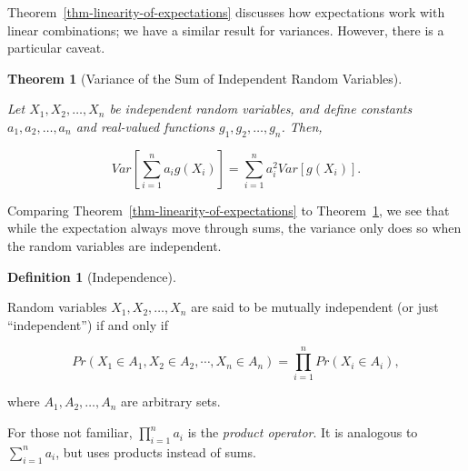 \documentclass[
  letterpaper,
  DIV=11,
  numbers=noendperiod]{scrreprt}
\theoremstyle{definition}
\newtheorem{definition}{Definition}[chapter]
\theoremstyle{plain}
\newtheorem{theorem}{Theorem}[chapter]
\theoremstyle{definition}
\theoremstyle{remark}
\begin{document}
Theorem~\ref{thm-linearity-of-expectations} discusses how expectations
work with linear combinations; we have a similar result for variances.
However, there is a particular caveat.

\begin{theorem}[Variance of the Sum of Independent Random
Variables]\protect\hypertarget{thm-variance-independent-sum}{}\label{thm-variance-independent-sum}

Let \(X_1, X_2, \dotsc, X_n\) be independent random variables, and
define constants \(a_1, a_2, \dotsc, a_n\) and real-valued functions
\(g_1, g_2, \dotsc, g_n\). Then,

\[Var\left[\sum_{i=1}^{n} a_i g\left(X_i\right)\right] = \sum_{i=1}^{n} a^2_i Var\left[g\left(X_i\right)\right].\]

\end{theorem}

Comparing Theorem~\ref{thm-linearity-of-expectations} to
Theorem~\ref{thm-variance-independent-sum}, we see that while the
expectation always move through sums, the variance only does so when the
random variables are independent.

\begin{definition}[Independence]\protect\hypertarget{def-independence}{}\label{def-independence}

Random variables \(X_1, X_2, \dotsc, X_n\) are said to be mutually
independent (or just ``independent'') if and only if

\[Pr\left(X_1 \in A_1, X_2 \in A_2, \dotsb, X_n \in A_n\right) = \prod_{i=1}^{n} Pr\left(X_i \in A_i\right),\]

where \(A_1, A_2, \dotsc, A_n\) are arbitrary sets.

\end{definition}

\begin{tcolorbox}[enhanced jigsaw, breakable, colframe=quarto-callout-note-color-frame, titlerule=0mm, arc=.35mm, coltitle=black, opacitybacktitle=0.6, leftrule=.75mm, opacityback=0, left=2mm, toprule=.15mm, colbacktitle=quarto-callout-note-color!10!white, title=\textcolor{quarto-callout-note-color}{\faInfo}\hspace{0.5em}{Note}, bottomtitle=1mm, toptitle=1mm, rightrule=.15mm, bottomrule=.15mm, colback=white]

For those not familiar, \(\prod_{i=1}^n a_i\) is the \emph{product
operator}. It is analogous to \(\sum_{i=1}^{n} a_i\), but uses products
instead of sums.

\end{tcolorbox}
\end{document}
